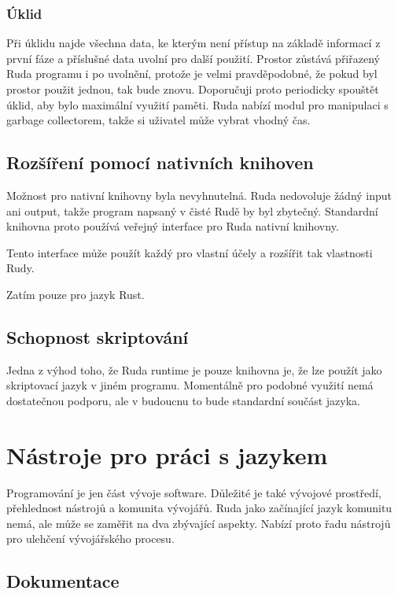 \documentclass[12pt, a4paper,
twoside,        %
openright
]{report}
\let\oldchapter\chapter
\renewcommand{\chapter}{
	\clearpage
	\pagestyle{fancy}
	\oldchapter
}
\begin{document}
\subsection{Úklid}

Při úklidu najde všechna data, ke kterým není přístup na základě informací z první fáze a příslušné data uvolní pro další použití. Prostor zůstává přiřazený Ruda programu i po uvolnění, protože je velmi pravděpodobné, že pokud byl prostor použit jednou, tak bude znovu. Doporučuji proto periodicky spouštět úklid, aby bylo maximální využití paměti. Ruda nabízí modul pro manipulaci s garbage collectorem, takže si uživatel může vybrat vhodný čas.

\section{Rozšíření pomocí nativních knihoven}

Možnost pro nativní knihovny byla nevyhnutelná. Ruda nedovoluje žádný input ani output, takže program napsaný v čisté Rudě by byl zbytečný. Standardní knihovna proto používá veřejný interface pro Ruda nativní knihovny. 

Tento interface může použít každý pro vlastní účely a rozšířit tak vlastnosti Rudy.

Zatím pouze pro jazyk Rust.

\section{Schopnost skriptování}

Jedna z výhod toho, že Ruda runtime je pouze knihovna je, že lze použít jako skriptovací jazyk v jiném programu. Momentálně pro podobné využití nemá dostatečnou podporu, ale v budoucnu to bude standardní součást jazyka.

\chapter{Nástroje pro práci s jazykem}

Programování je jen část vývoje software. Důležité je také vývojové prostředí, přehlednost nástrojů a komunita vývojářů. Ruda jako začínající jazyk komunitu nemá, ale může se zaměřit na dva zbývající aspekty. Nabízí proto řadu nástrojů pro ulehčení vývojářského procesu.

\section{Dokumentace}
\end{document}
